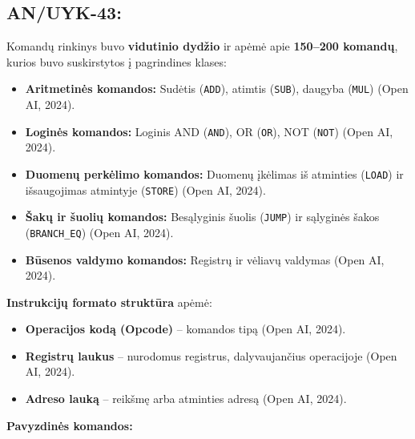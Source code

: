 \documentclass[a4paper,12pt]{article}
\begin{document}
\subsection{AN/UYK-43:}
Komandų rinkinys buvo \textbf{vidutinio dydžio} ir apėmė apie \textbf{150–200 komandų}, kurios buvo suskirstytos į pagrindines klases:
\begin{itemize}
    \item \textbf{Aritmetinės komandos:} Sudėtis (\texttt{ADD}), atimtis (\texttt{SUB}), daugyba (\texttt{MUL}) (Open AI, 2024).
    \item \textbf{Loginės komandos:} Loginis AND (\texttt{AND}), OR (\texttt{OR}), NOT (\texttt{NOT}) (Open AI, 2024).
    \item \textbf{Duomenų perkėlimo komandos:} Duomenų įkėlimas iš atminties (\texttt{LOAD}) ir išsaugojimas atmintyje (\texttt{STORE}) (Open AI, 2024).
    \item \textbf{Šakų ir šuolių komandos:} Besąlyginis šuolis (\texttt{JUMP}) ir sąlyginės šakos (\texttt{BRANCH\_EQ}) (Open AI, 2024).
    \item \textbf{Būsenos valdymo komandos:} Registrų ir vėliavų valdymas (Open AI, 2024).
\end{itemize}
\textbf{Instrukcijų formato struktūra} apėmė:
\begin{itemize}
    \item \textbf{Operacijos kodą (Opcode)} – komandos tipą (Open AI, 2024).
    \item \textbf{Registrų laukus} – nurodomus registrus, dalyvaujančius operacijoje (Open AI, 2024).
    \item \textbf{Adreso lauką} – reikšmę arba atminties adresą (Open AI, 2024).
\end{itemize}
\textbf{Pavyzdinės komandos:}
\end{document}
